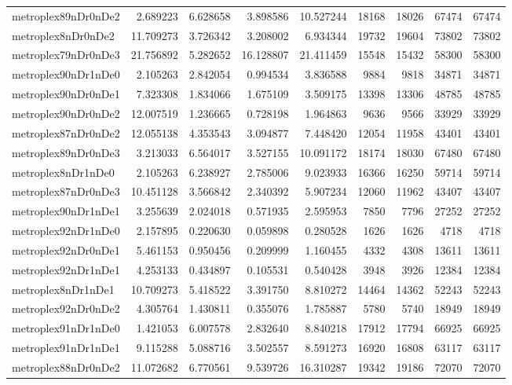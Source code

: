\begin{longtable}{|l|r|r|r|r|r|r|r|r|}
metroplex89nDr0nDe2 & 2.689223 & 6.628658 & 3.898586 & 10.527244 & 18168 & 18026 & 67474 & 67474 \\
metroplex8nDr0nDe2 & 11.709273 & 3.726342 & 3.208002 & 6.934344 & 19732 & 19604 & 73802 & 73802 \\
metroplex79nDr0nDe3 & 21.756892 & 5.282652 & 16.128807 & 21.411459 & 15548 & 15432 & 58300 & 58300 \\
metroplex90nDr1nDe0 & 2.105263 & 2.842054 & 0.994534 & 3.836588 & 9884 & 9818 & 34871 & 34871 \\
metroplex90nDr0nDe1 & 7.323308 & 1.834066 & 1.675109 & 3.509175 & 13398 & 13306 & 48785 & 48785 \\
metroplex90nDr0nDe2 & 12.007519 & 1.236665 & 0.728198 & 1.964863 & 9636 & 9566 & 33929 & 33929 \\
metroplex87nDr0nDe2 & 12.055138 & 4.353543 & 3.094877 & 7.448420 & 12054 & 11958 & 43401 & 43401 \\
metroplex89nDr0nDe3 & 3.213033 & 6.564017 & 3.527155 & 10.091172 & 18174 & 18030 & 67480 & 67480 \\
metroplex8nDr1nDe0 & 2.105263 & 6.238927 & 2.785006 & 9.023933 & 16366 & 16250 & 59714 & 59714 \\
metroplex87nDr0nDe3 & 10.451128 & 3.566842 & 2.340392 & 5.907234 & 12060 & 11962 & 43407 & 43407 \\
metroplex90nDr1nDe1 & 3.255639 & 2.024018 & 0.571935 & 2.595953 & 7850 & 7796 & 27252 & 27252 \\
metroplex92nDr1nDe0 & 2.157895 & 0.220630 & 0.059898 & 0.280528 & 1626 & 1626 & 4718 & 4718 \\
metroplex92nDr0nDe1 & 5.461153 & 0.950456 & 0.209999 & 1.160455 & 4332 & 4308 & 13611 & 13611 \\
metroplex92nDr1nDe1 & 4.253133 & 0.434897 & 0.105531 & 0.540428 & 3948 & 3926 & 12384 & 12384 \\
metroplex8nDr1nDe1 & 10.709273 & 5.418522 & 3.391750 & 8.810272 & 14464 & 14362 & 52243 & 52243 \\
metroplex92nDr0nDe2 & 4.305764 & 1.430811 & 0.355076 & 1.785887 & 5780 & 5740 & 18949 & 18949 \\
metroplex91nDr1nDe0 & 1.421053 & 6.007578 & 2.832640 & 8.840218 & 17912 & 17794 & 66925 & 66925 \\
metroplex91nDr1nDe1 & 9.115288 & 5.088716 & 3.502557 & 8.591273 & 16920 & 16808 & 63117 & 63117 \\
metroplex88nDr0nDe2 & 11.072682 & 6.770561 & 9.539726 & 16.310287 & 19342 & 19186 & 72070 & 72070 \\

\end{longtable}
